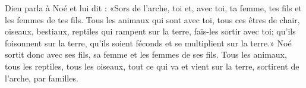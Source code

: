 Dieu parla à Noé et lui dit :
	«Sors de l’arche, toi et, avec toi, ta femme,
	tes fils et les femmes de tes fils.
Tous les animaux qui sont avec toi, tous ces êtres de chair,
	oiseaux, bestiaux, reptiles qui rampent sur la terre,
	fais-les sortir avec toi;
	qu’ils foisonnent sur la terre,
	qu’ils soient féconds et se multiplient sur la terre.»
Noé sortit donc avec ses fils, sa femme et les femmes de ses fils.
Tous les animaux, tous les reptiles, tous les oiseaux,
	tout ce qui va et vient sur la terre,
	sortirent de l’arche, par familles.
